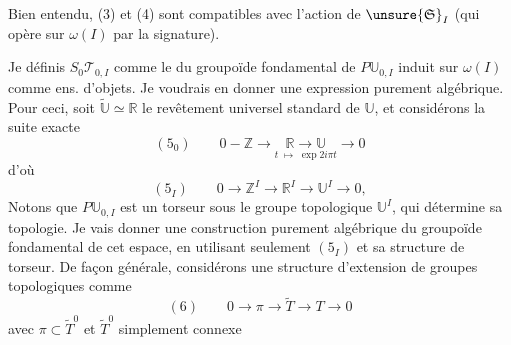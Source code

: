 Bien entendu, (3) et (4) sont compatibles avec l'action de $\unsure{\mathfrak S}_I$ (qui opère sur $\omega(I)$ par la signature).

Je définis $S_0\mathcal T_{0,I}$ comme le  du groupoïde fondamental de $P\mathbb U_{0,I}$ induit  sur $\omega(I)$ comme ens. d'objets. Je voudrais en donner une expression purement algébrique. Pour ceci, soit $\widetilde{\mathbb U}\simeq\mathbb R$ le  revêtement universel standard de $\mathbb U$, et considérons la suite exacte
\[
(5_0)\qquad 0-\mathbb Z\longrightarrow
\underset{t\;\mapsto\;\exp 2i\pi t}{\mathbb R\longrightarrow\mathbb U}
\longrightarrow0
\]
d'où
\[
(5_I)\qquad0\longrightarrow\mathbb Z^I\longrightarrow\mathbb R^I\longrightarrow\mathbb U^I\longrightarrow0,
\]
 Notons que $P\mathbb U_{0,I}$ est un torseur sous le groupe topologique $\mathbb U^I$,  qui détermine sa topologie. Je vais donner une construction purement algébrique du groupoïde fondamental de cet espace, en utilisant seulement $(5_I)$ et sa structure de torseur. De façon générale, considérons une structure d'extension de groupes topologiques comme
\[
(6)\qquad0\longrightarrow\pi\longrightarrow\widetilde T\longrightarrow T\longrightarrow0
\]
avec  $\pi\subset\widetilde T^0$ et $\widetilde T^0$ simplement connexe
